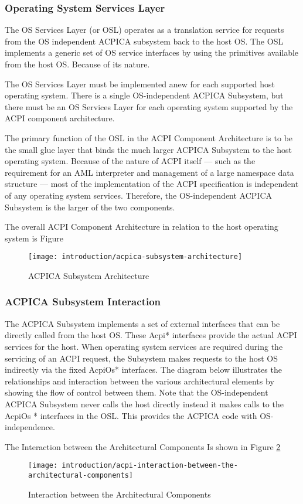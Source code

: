 \subsubsection{Operating System Services Layer}
The OS Services Layer (or OSL) operates as a translation service for requests from the OS independent ACPICA subsystem back to the host OS. The OSL implements a generic set of OS service interfaces by using the primitives available from the host OS. Because of its nature.

The OS Services Layer must be implemented anew for each supported host operating
system. There is a single OS-independent ACPICA Subsystem, but there must be an OS Services
Layer for each operating system supported by the ACPI component architecture.

The primary function of the OSL in the ACPI Component Architecture is to be the small
glue layer that binds the much larger ACPICA Subsystem to the host operating system. Because
of the nature of ACPI itself — such as the requirement for an AML interpreter and management
of a large namespace data structure — most of the implementation of the ACPI specification is
independent of any operating system services. Therefore, the OS-independent ACPICA Subsystem
is the larger of the two components.

The overall ACPI Component Architecture in relation to the host operating system is Figure

\begin{figure}[h]
	\centering
	\texttt{[image: introduction/acpica-subsystem-architecture]}
	\caption{ACPICA Subsystem Architecture}\label{fig:introduction-acpica-subsystem-architecture}
\end{figure}

\subsubsection{ACPICA Subsystem Interaction}
The ACPICA Subsystem implements a set of external interfaces that can be directly called from
the host OS. These Acpi* interfaces provide the actual ACPI services for the host. When operating
system services are required during the servicing of an ACPI request, the Subsystem makes
requests to the host OS indirectly via the fixed AcpiOs* interfaces. The diagram below illustrates
the relationships and interaction between the various architectural elements by showing the flow
of control between them. Note that the OS-independent ACPICA Subsystem never calls the host directly instead it makes calls to the AcpiOs * interfaces in the OSL. This provides the ACPICA
code with OS-independence.

The Interaction between the Architectural Components Is shown in Figure \ref{fig:-introduction-acpi-interaction-between-the-architectural-components}

\begin{figure}[h]
	\centering
	\texttt{[image: introduction/acpi-interaction-between-the-architectural-components]}
	\caption{Interaction between the Architectural Components}\label{fig:-introduction-acpi-interaction-between-the-architectural-components}
\end{figure}

